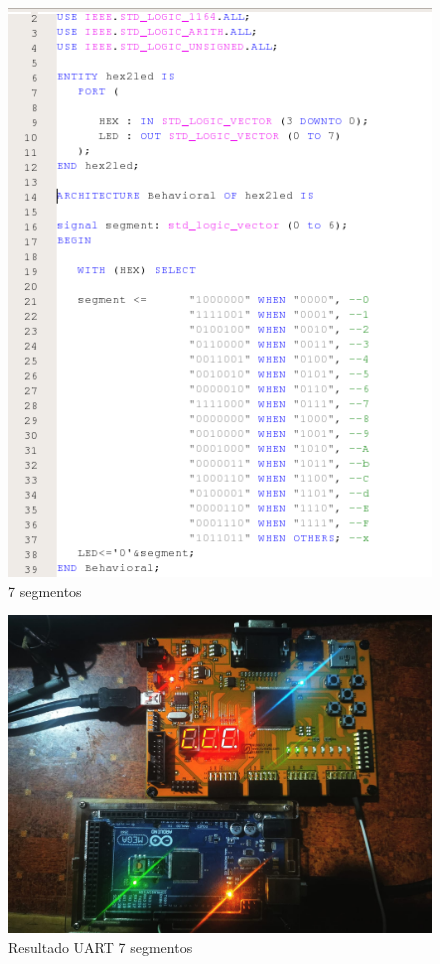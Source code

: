 \documentclass[osajnl,twocolumn,showpacs,superscriptaddress,10pt]{revtex4-1}
\begin{document}
\begin{figure}[H]
    \centering
    \includegraphics[scale=0.4]{images/7segment.png}
    \caption{7 segmentos}
\end{figure}


\begin{figure}[H]
    \centering
    \includegraphics[scale=0.1]{images/WhatsApp Image 2023-10-01 at 3.32.39 AM.jpeg}
    \caption{Resultado UART 7 segmentos}
\end{figure}
\end{document}
